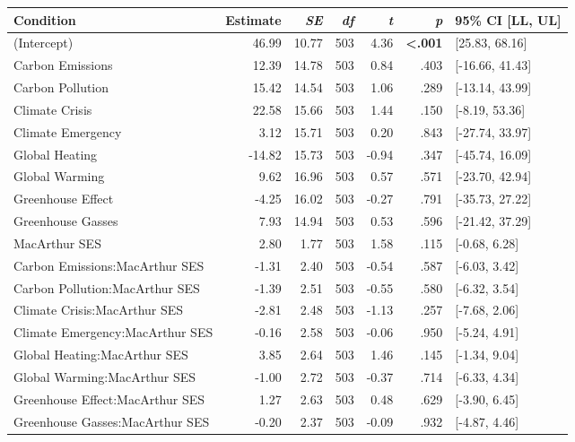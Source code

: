 \begin{table}[ht]
\centering
\begin{tabular}{lrrrrrl}
  \hline
Condition & Estimate & \textit{SE} & \textit{df} & \textit{t} & \textit{p} & 95\% CI [LL, UL] \\ 
  \hline
(Intercept) & 46.99 & 10.77 & 503 & 4.36 & \textbf{\textless  .001} & [25.83, 68.16] \\ 
  Carbon Emissions & 12.39 & 14.78 & 503 & 0.84 & .403 & [-16.66, 41.43] \\ 
  Carbon Pollution & 15.42 & 14.54 & 503 & 1.06 & .289 & [-13.14, 43.99] \\ 
  Climate Crisis & 22.58 & 15.66 & 503 & 1.44 & .150 & [-8.19, 53.36] \\ 
  Climate Emergency & 3.12 & 15.71 & 503 & 0.20 & .843 & [-27.74, 33.97] \\ 
  Global Heating & -14.82 & 15.73 & 503 & -0.94 & .347 & [-45.74, 16.09] \\ 
  Global Warming & 9.62 & 16.96 & 503 & 0.57 & .571 & [-23.70, 42.94] \\ 
  Greenhouse Effect & -4.25 & 16.02 & 503 & -0.27 & .791 & [-35.73, 27.22] \\ 
  Greenhouse Gasses & 7.93 & 14.94 & 503 & 0.53 & .596 & [-21.42, 37.29] \\ 
  MacArthur SES & 2.80 & 1.77 & 503 & 1.58 & .115 & [-0.68, 6.28] \\ 
  Carbon Emissions:MacArthur SES & -1.31 & 2.40 & 503 & -0.54 & .587 & [-6.03, 3.42] \\ 
  Carbon Pollution:MacArthur SES & -1.39 & 2.51 & 503 & -0.55 & .580 & [-6.32, 3.54] \\ 
  Climate Crisis:MacArthur SES & -2.81 & 2.48 & 503 & -1.13 & .257 & [-7.68, 2.06] \\ 
  Climate Emergency:MacArthur SES & -0.16 & 2.58 & 503 & -0.06 & .950 & [-5.24, 4.91] \\ 
  Global Heating:MacArthur SES & 3.85 & 2.64 & 503 & 1.46 & .145 & [-1.34, 9.04] \\ 
  Global Warming:MacArthur SES & -1.00 & 2.72 & 503 & -0.37 & .714 & [-6.33, 4.34] \\ 
  Greenhouse Effect:MacArthur SES & 1.27 & 2.63 & 503 & 0.48 & .629 & [-3.90, 6.45] \\ 
  Greenhouse Gasses:MacArthur SES & -0.20 & 2.37 & 503 & -0.09 & .932 & [-4.87, 4.46] \\ 
   \hline
\end{tabular}
\end{table}
